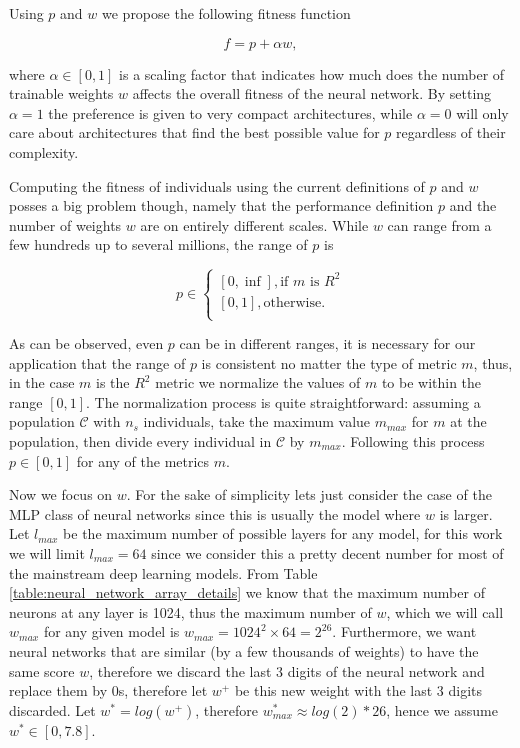 \documentclass[journal]{IEEEtran}
\begin{document}
Using $p$ and $w$ we propose the following fitness function

\begin{equation}
f = p + \alpha w, 
\label{eq:fitness_function}
\end{equation}

where $\alpha \in [0,1]$ is a scaling factor that indicates how much does the number of trainable weights $w$ affects the overall fitness of the neural network. By setting $\alpha = 1$ the preference is given to very compact architectures, while $\alpha = 0$ will only care about architectures that find the best possible value for $p$ regardless of their complexity.

Computing the fitness of individuals using the current definitions of $p$ and $w$ posses a big problem though, namely that the performance definition $p$ and the number of weights $w$ are on entirely different scales. While $w$ can range from a few hundreds up to several millions, the range of $p$ is 

\begin{equation}
p \in
\begin{cases}
\left[ 0, \inf \right], \text{if } m \text{ is } R^2 \\
\left[ 0,1 \right],  \text{otherwise}.\\
\end{cases}
\end{equation}

As can be observed, even $p$ can be in different ranges, it is necessary for our application that the range of $p$ is consistent no matter the type of metric $m$, thus, in the case $m$ is the $R^2$ metric we normalize the values of $m$ to be within the range $\left[ 0,1 \right]$. The normalization process is quite straightforward: assuming a population $\mathcal{C}$ with $n_s$ individuals, take the maximum value $m_{max}$ for $m$ at the population, then divide every individual in $\mathcal{C}$ by $m_{max}$. Following this process $p \in \left[ 0,1 \right]$ for any of the metrics $m$.

Now we focus on $w$. For the sake of simplicity lets just consider the case of the MLP class of neural networks since this is usually the model where $w$ is larger. Let $l_{max}$ be the maximum number of possible layers for any model, for this work we will limit $l_{max} = 64$ since we consider this a pretty decent number for most of the mainstream deep learning models. From Table \ref{table:neural_network_array_details} we know that the maximum number of neurons at any layer is 1024, thus the maximum number of $w$, which we will call $w_{max}$ for any given model is $w_{max} = 1024^2 \times 64 = 2^{26}$. Furthermore, we want neural networks that are similar (by a few thousands of weights) to have the same score $w$, therefore we discard the last 3 digits of the neural network and replace them by 0s, therefore let $w^+$ be this new weight with the last 3 digits discarded. Let $w^* = log(w^+)$, therefore $w_{max}^* \approx  log(2)*26$, hence we assume $w^* \in \left[0, 7.8\right]$.
\end{document}
